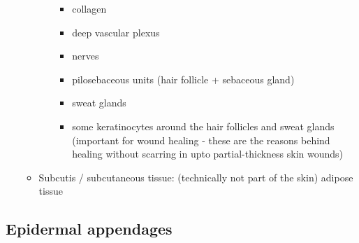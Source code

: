 \documentclass[
  12pt,
]{memoir}
\providecommand{\tightlist}{%
  \setlength{\itemsep}{0pt}\setlength{\parskip}{0pt}}
\begin{document}
\begin{itemize}
\begin{itemize}
\begin{itemize}
      \begin{itemize}
      \tightlist
      \item
        collagen
      \item
        deep vascular plexus
      \item
        nerves
      \item
        pilosebaceous units (hair follicle + sebaceous gland)
      \item
        sweat glands
      \item
        some keratinocytes around the hair follicles and sweat glands
        (important for wound healing - these are the reasons behind
        healing without scarring in upto partial-thickness skin wounds)
      \end{itemize}
    \end{itemize}
  \item
    Subcutis / subcutaneous tissue: (technically not part of the skin)
    adipose tissue
  \end{itemize}
\end{itemize}

\hypertarget{epidermal-appendages}{%
\subsection{Epidermal appendages}\label{epidermal-appendages}}
\end{document}
